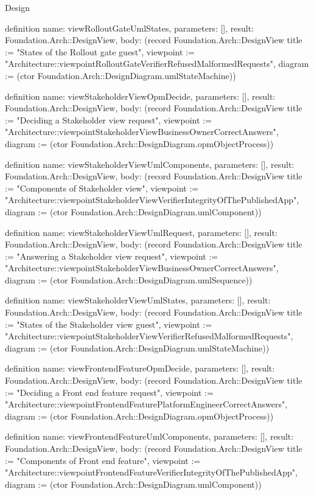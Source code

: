 \begin{lexlean}{Design}
\begin{semanticmodule}
definition{
  name: viewRolloutGateUmlStates,
  parameters: [],
  result: Foundation.Arch::DesignView,
  body: (record Foundation.Arch::DesignView {title := "States of the Rollout gate guest", viewpoint := "Architecture::viewpointRolloutGateVerifierRefusedMalformedRequests", diagram := (ctor Foundation.Arch::DesignDiagram.umlStateMachine)})
}

definition{
  name: viewStakeholderViewOpmDecide,
  parameters: [],
  result: Foundation.Arch::DesignView,
  body: (record Foundation.Arch::DesignView {title := "Deciding a Stakeholder view request", viewpoint := "Architecture::viewpointStakeholderViewBusinessOwnerCorrectAnswers", diagram := (ctor Foundation.Arch::DesignDiagram.opmObjectProcess)})
}

definition{
  name: viewStakeholderViewUmlComponents,
  parameters: [],
  result: Foundation.Arch::DesignView,
  body: (record Foundation.Arch::DesignView {title := "Components of Stakeholder view", viewpoint := "Architecture::viewpointStakeholderViewVerifierIntegrityOfThePublishedApp", diagram := (ctor Foundation.Arch::DesignDiagram.umlComponent)})
}

definition{
  name: viewStakeholderViewUmlRequest,
  parameters: [],
  result: Foundation.Arch::DesignView,
  body: (record Foundation.Arch::DesignView {title := "Answering a Stakeholder view request", viewpoint := "Architecture::viewpointStakeholderViewBusinessOwnerCorrectAnswers", diagram := (ctor Foundation.Arch::DesignDiagram.umlSequence)})
}

definition{
  name: viewStakeholderViewUmlStates,
  parameters: [],
  result: Foundation.Arch::DesignView,
  body: (record Foundation.Arch::DesignView {title := "States of the Stakeholder view guest", viewpoint := "Architecture::viewpointStakeholderViewVerifierRefusedMalformedRequests", diagram := (ctor Foundation.Arch::DesignDiagram.umlStateMachine)})
}

definition{
  name: viewFrontendFeatureOpmDecide,
  parameters: [],
  result: Foundation.Arch::DesignView,
  body: (record Foundation.Arch::DesignView {title := "Deciding a Front end feature request", viewpoint := "Architecture::viewpointFrontendFeaturePlatformEngineerCorrectAnswers", diagram := (ctor Foundation.Arch::DesignDiagram.opmObjectProcess)})
}

definition{
  name: viewFrontendFeatureUmlComponents,
  parameters: [],
  result: Foundation.Arch::DesignView,
  body: (record Foundation.Arch::DesignView {title := "Components of Front end feature", viewpoint := "Architecture::viewpointFrontendFeatureVerifierIntegrityOfThePublishedApp", diagram := (ctor Foundation.Arch::DesignDiagram.umlComponent)})
}


\end{semanticmodule}
\end{lexlean}
